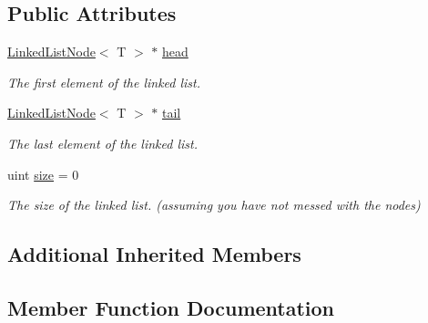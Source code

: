 \subsection*{Public Attributes}
\begin{DoxyCompactItemize}
\item 
\mbox{\label{classutil_1_1LinkedList_a5d07996afe2eb21d93dc16696e993f17}} 
\hyperlink{classutil_1_1LinkedListNode}{Linked\+List\+Node}$<$ T $>$ $\ast$ \hyperlink{classutil_1_1LinkedList_a5d07996afe2eb21d93dc16696e993f17}{head}
\begin{DoxyCompactList}\small\item\em The first element of the linked list. \end{DoxyCompactList}\item 
\mbox{\label{classutil_1_1LinkedList_a7f9270c04b21a3e60cb295949da09059}} 
\hyperlink{classutil_1_1LinkedListNode}{Linked\+List\+Node}$<$ T $>$ $\ast$ \hyperlink{classutil_1_1LinkedList_a7f9270c04b21a3e60cb295949da09059}{tail}
\begin{DoxyCompactList}\small\item\em The last element of the linked list. \end{DoxyCompactList}\item 
\mbox{\label{classutil_1_1LinkedList_a8418657f94925a9d4240e3d96e1abab3}} 
uint \hyperlink{classutil_1_1LinkedList_a8418657f94925a9d4240e3d96e1abab3}{size} = 0
\begin{DoxyCompactList}\small\item\em The size of the linked list. (assuming you have not messed with the nodes) \end{DoxyCompactList}\end{DoxyCompactItemize}
\subsection*{Additional Inherited Members}


\subsection{Member Function Documentation}
\mbox{\label{classutil_1_1LinkedList_ad3586e05f1b6f9d6b4cebba91433a2e7}} 
